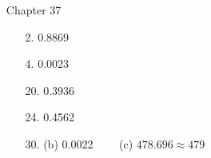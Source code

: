 \documentclass[12pt]{article}
\begin{document}
\begin{itemize}
\item[Chapter 37]        \label{ANS_37}
	\begin{itemize}
	\item[2.] 0.8869
	\item[4.]  0.0023
	\item[20.]  0.3936
	\item[24.] 0.4562
	\item[30.]  (b)  0.0022 \ \ \ \ (c)  $478.696\approx 479$
	\end{itemize}





\end{itemize}  %
\end{document}
